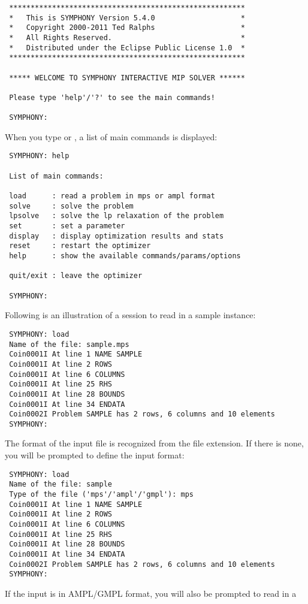 {\color{Brown}
\begin{verbatim}
 *******************************************************
 *   This is SYMPHONY Version 5.4.0                    *
 *   Copyright 2000-2011 Ted Ralphs                    *
 *   All Rights Reserved.                              *
 *   Distributed under the Eclipse Public License 1.0  *
 *******************************************************

 ***** WELCOME TO SYMPHONY INTERACTIVE MIP SOLVER ******

 Please type 'help'/'?' to see the main commands!

 SYMPHONY:
\end{verbatim}
}
When you type  or , a list of main commands is displayed:
{\color{Brown}
\begin{verbatim}
 SYMPHONY: help

 List of main commands:

 load      : read a problem in mps or ampl format
 solve     : solve the problem
 lpsolve   : solve the lp relaxation of the problem
 set       : set a parameter
 display   : display optimization results and stats
 reset     : restart the optimizer
 help      : show the available commands/params/options

 quit/exit : leave the optimizer

 SYMPHONY:
\end{verbatim}
}
Following is an illustration of a session to read in a sample instance:
{\color{Brown}
\begin{verbatim}
 SYMPHONY: load 
 Name of the file: sample.mps
 Coin0001I At line 1 NAME SAMPLE
 Coin0001I At line 2 ROWS
 Coin0001I At line 6 COLUMNS
 Coin0001I At line 25 RHS
 Coin0001I At line 28 BOUNDS
 Coin0001I At line 34 ENDATA
 Coin0002I Problem SAMPLE has 2 rows, 6 columns and 10 elements
 SYMPHONY: 
\end{verbatim}
}
The format of the input file is recognized from the file extension. If there is
none, you will be prompted to define the input format: 
{\color{Brown}
\begin{verbatim}
 SYMPHONY: load 
 Name of the file: sample
 Type of the file ('mps'/'ampl'/'gmpl'): mps 
 Coin0001I At line 1 NAME SAMPLE
 Coin0001I At line 2 ROWS
 Coin0001I At line 6 COLUMNS
 Coin0001I At line 25 RHS
 Coin0001I At line 28 BOUNDS
 Coin0001I At line 34 ENDATA
 Coin0002I Problem SAMPLE has 2 rows, 6 columns and 10 elements
 SYMPHONY: 
\end{verbatim}
} 
If the input is in AMPL/GMPL format, you will also be prompted to read in a
